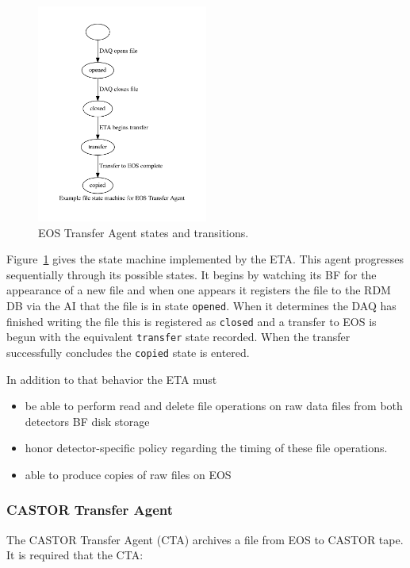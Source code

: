 \documentclass[pdftex,12pt,letter]{article}
\begin{document}
\begin{figure}[h]
  \centering
  \includegraphics[width=0.5\textwidth]{state.pdf}
  \caption{EOS Transfer Agent states and transitions.}
  \label{fig:state}
\end{figure}

Figure~\ref{fig:state} gives the state machine implemented by the ETA.
This agent progresses sequentially through its possible states.  It
begins by watching its BF for the appearance of a new file and when
one appears it registers the file to the RDM DB via the AI that the
file is in state \texttt{opened}.  When it determines the DAQ has
finished writing the file this is registered as \texttt{closed} and a
transfer to EOS is begun with the equivalent \texttt{transfer} state
recorded.  When the transfer successfully concludes the
\texttt{copied} state is entered.

In addition to that behavior the ETA must
\begin{itemize}
\item be able to perform read and delete file operations on raw data
  files from both detectors BF disk storage
\item honor detector-specific policy regarding the timing of these
  file operations.
\item able to produce copies of raw files on EOS
\end{itemize}


\subsubsection{CASTOR Transfer Agent}

The CASTOR Transfer Agent (CTA) archives a file from EOS to CASTOR
tape.  It is required that the CTA:
\end{document}
